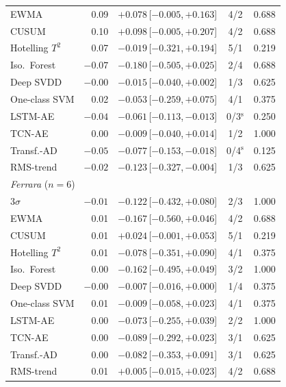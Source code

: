 \begin{table}[t]
\begin{center}
\begin{tabular}{l r r c r}
		EWMA & 0.09 & $+0.078$\,[$-0.005$,\,$+0.163$] & 4/2 & 0.688 \\
		CUSUM & 0.10 & $+0.098$\,[$-0.005$,\,$+0.207$] & 4/2 & 0.688 \\
		Hotelling $T^2$ & 0.07 & $-0.019$\,[$-0.321$,\,$+0.194$] & 5/1 & 0.219 \\
		Iso.\ Forest & $-0.07$ & $-0.180$\,[$-0.505$,\,$+0.025$] & 2/4 & 0.688 \\
		Deep SVDD & $-0.00$ & $-0.015$\,[$-0.040$,\,$+0.002$] & 1/3 & 0.625 \\
		One-class SVM & 0.02 & $-0.053$\,[$-0.259$,\,$+0.075$] & 4/1 & 0.375 \\
		LSTM-AE & $-0.04$ & $-0.061$\,[$-0.113$,\,$-0.013$] & 0/3$^{\mathrm{s}}$ & 0.250 \\
		TCN-AE & 0.00 & $-0.009$\,[$-0.040$,\,$+0.014$] & 1/2 & 1.000 \\
		Transf.-AD & $-0.05$ & $-0.077$\,[$-0.153$,\,$-0.018$] & 0/4$^{\mathrm{s}}$ & 0.125 \\
		RMS-trend & $-0.02$ & $-0.123$\,[$-0.327$,\,$-0.004$] & 1/3 & 0.625 \\
		\hline
		\multicolumn{5}{l}{\emph{Ferrara} ($n=6$)} \\
		$3\sigma$ & $-0.01$ & $-0.122$\,[$-0.432$,\,$+0.080$] & 2/3 & 1.000 \\
		EWMA & 0.01 & $-0.167$\,[$-0.560$,\,$+0.046$] & 4/2 & 0.688 \\
		CUSUM & 0.01 & $+0.024$\,[$-0.001$,\,$+0.053$] & 5/1 & 0.219 \\
		Hotelling $T^2$ & 0.01 & $-0.078$\,[$-0.351$,\,$+0.090$] & 4/1 & 0.375 \\
		Iso.\ Forest & 0.00 & $-0.162$\,[$-0.495$,\,$+0.049$] & 3/2 & 1.000 \\
		Deep SVDD & $-0.00$ & $-0.007$\,[$-0.016$,\,$+0.000$] & 1/4 & 0.375 \\
		One-class SVM & 0.01 & $-0.009$\,[$-0.058$,\,$+0.023$] & 4/1 & 0.375 \\
		LSTM-AE & 0.00 & $-0.073$\,[$-0.255$,\,$+0.039$] & 2/2 & 1.000 \\
		TCN-AE & 0.00 & $-0.089$\,[$-0.292$,\,$+0.023$] & 3/1 & 0.625 \\
		Transf.-AD & 0.00 & $-0.082$\,[$-0.353$,\,$+0.091$] & 3/1 & 0.625 \\
		RMS-trend & 0.01 & $+0.005$\,[$-0.015$,\,$+0.023$] & 4/2 & 0.688 \\
		\hline \hline
	\end{tabular}
	\end{center}
\end{table}
